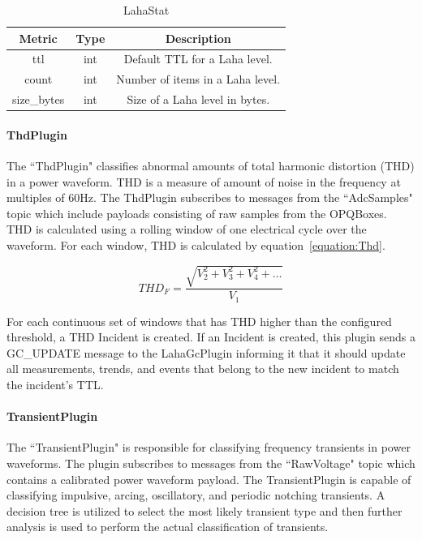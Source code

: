 \begin{table}[H]
	\centering
	\caption{LahaStat}
	\begin{tabular}{|c|c|c|}
		\hline
		Metric & Type & Description \\
		\hline
		ttl & int & Default TTL for a Laha level. \\
		\hline
		count & int & Number of items in a Laha level. \\
		\hline
		size\_bytes & int & Size of a Laha level in bytes. \\
		\hline
	\end{tabular}
	\label{table:MetricsLaha}
\end{table}

\paragraph{ThdPlugin}
The ``ThdPlugin" classifies abnormal amounts of total harmonic distortion (THD) in a power waveform. THD is a measure of amount of noise in the frequency at multiples of 60Hz. The ThdPlugin subscribes to messages from the ``AdcSamples" topic which include payloads consisting of raw samples from the OPQBoxes. THD is calculated using a rolling window of one electrical cycle over the waveform. For each window, THD is calculated by equation~\ref{equation:Thd}.

\begin{equation}
\label{equation:Thd}
	THD_F = \frac{\sqrt{V_2^2 + V_3^2 + V_4^2 + \dots}}{V_1}
\end{equation}

For each continuous set of windows that has THD higher than the configured threshold, a THD Incident is created. If an Incident is created, this plugin sends a GC\_UPDATE message to the LahaGcPlugin informing it that it should update all measurements, trends, and events that belong to the new incident to match the incident's TTL\@.


\paragraph{TransientPlugin}
The ``TransientPlugin" is responsible for classifying frequency transients in power waveforms. The plugin subscribes to messages from the ``RawVoltage" topic which contains a calibrated power waveform payload. The TransientPlugin is capable of classifying impulsive, arcing, oscillatory, and periodic notching transients. A decision tree is utilized to select the most likely transient type and then further analysis is used to perform the actual classification of transients.

